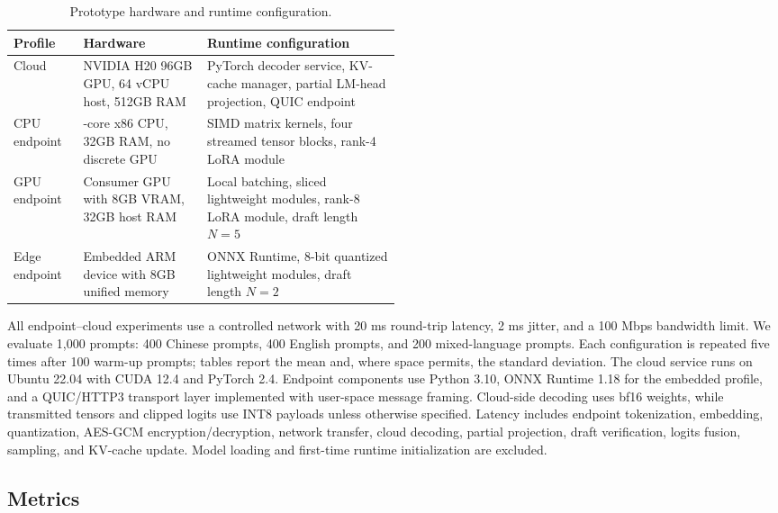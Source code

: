 \documentclass{article}
\begin{document}
\begin{table}[H]
\centering
\caption{Prototype hardware and runtime configuration.}
\label{tab:hardware}
\small
\setlength{\tabcolsep}{3pt}
\renewcommand{\arraystretch}{1.12}
\begin{tabularx}{\linewidth}{>{\raggedright\arraybackslash}p{0.18\linewidth} >{\raggedright\arraybackslash}p{0.32\linewidth} >{\raggedright\arraybackslash}X}
\toprule
Profile & Hardware & Runtime configuration \\
\midrule
Cloud & NVIDIA H20 96GB GPU, 64 vCPU host, 512GB RAM & PyTorch decoder service, KV-cache manager, partial LM-head projection, QUIC endpoint \\
CPU endpoint & 12-core x86 CPU, 32GB RAM, no discrete GPU & SIMD matrix kernels, four streamed tensor blocks, rank-4 LoRA module \\
GPU endpoint & Consumer GPU with 8GB VRAM, 32GB host RAM & Local batching, sliced lightweight modules, rank-8 LoRA module, draft length $N=5$ \\
Edge endpoint & Embedded ARM device with 8GB unified memory & ONNX Runtime, 8-bit quantized lightweight modules, draft length $N=2$ \\
\bottomrule
\end{tabularx}
\end{table}

All endpoint--cloud experiments use a controlled network with 20 ms round-trip latency, 2 ms jitter, and a 100 Mbps bandwidth limit. We evaluate 1{,}000 prompts: 400 Chinese prompts, 400 English prompts, and 200 mixed-language prompts. Each configuration is repeated five times after 100 warm-up prompts; tables report the mean and, where space permits, the standard deviation. The cloud service runs on Ubuntu 22.04 with CUDA 12.4 and PyTorch 2.4. Endpoint components use Python 3.10, ONNX Runtime 1.18 for the embedded profile, and a QUIC/HTTP3 transport layer implemented with user-space message framing. Cloud-side decoding uses bf16 weights, while transmitted tensors and clipped logits use INT8 payloads unless otherwise specified. Latency includes endpoint tokenization, embedding, quantization, AES-GCM encryption/decryption, network transfer, cloud decoding, partial projection, draft verification, logits fusion, sampling, and KV-cache update. Model loading and first-time runtime initialization are excluded.

\subsection{Metrics}
\end{document}
